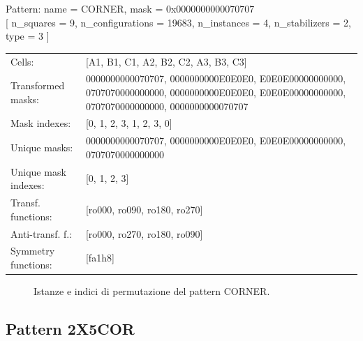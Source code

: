 \begin{tcolorbox}[sharp corners, fontupper=\ttfamily\small, colback=white]
  \noindent Pattern: name = CORNER, mask = 0x0000000000070707\\
  {[} n\_squares = 9, n\_configurations = 19683,
  n\_instances = 4, n\_stabilizers = 2, type = 3 { ]}\\[1.0ex]
  \begin{tabularx}{\textwidth}{@{} p{3.5cm} X @{}}
    Cells:               & {[}A1, B1, C1, A2, B2, C2, A3, B3, C3{]}\\[0.5ex]
    Transformed masks:   & 0000000000070707, 0000000000E0E0E0, E0E0E00000000000, 0707070000000000, 0000000000E0E0E0, E0E0E00000000000, 0707070000000000, 0000000000070707\\[0.5ex]
    Mask indexes:        & {[}0, 1, 2, 3, 1, 2, 3, 0{]}\\[0.5ex]
    Unique masks:        & 0000000000070707, 0000000000E0E0E0, E0E0E00000000000, 0707070000000000\\[0.5ex]
    Unique mask indexes: & {[}0, 1, 2, 3{]}\\[0.5ex]
    Transf. functions:   & {[}ro000, ro090, ro180, ro270{]}\\[0.5ex]
    Anti-transf. f.:     & {[}ro000, ro270, ro180, ro090{]}\\[0.5ex]
    Symmetry functions:  & {[}fa1h8{]}\\[0.5ex]
  \end{tabularx}
\end{tcolorbox}

\begin{figure}[htbp]
  \centering
   \hfill
   \hfill
   \hfill
  \vspace{0.3cm}
   \hfill
   \hfill
   \hfill
  \caption{Istanze e indici di permutazione del pattern CORNER.}
\end{figure}

\newpage

\subsection{Pattern 2X5COR}

